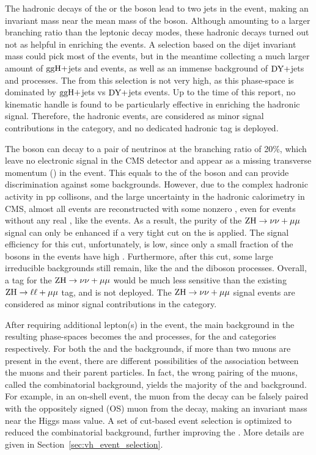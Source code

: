 The hadronic decays of the \PW or the \PZ boson lead to two jets in the event, making an invariant mass near the mean mass of the boson.
Although amounting to a larger branching ratio than the leptonic decay modes, these hadronic decays turned out not as helpful in enriching the \VH events.
A selection based on the dijet invariant mass could pick most of the \VH events, but in the meantime collecting a much larger amount of $\mathrm{g}\mathrm{g}\mathrm{H}+$jets and \qqH events, 
as well as an immense background of $\mbox{DY}+$jets and \ttbar processes.
The \SoB from this selection is not very high, as this phase-space is dominated by $\mathrm{g}\mathrm{g}\mathrm{H}+$jets vs $\mbox{DY}+$jets events.
Up to the time of this report, no kinematic handle is found to be particularly effective in enriching the hadronic \VH signal.
Therefore, the hadronic \VH events, are considered as minor signal contributions in the \ggH category, 
and no dedicated \VH hadronic tag is deployed.

The \PZ boson can decay to a pair of neutrinos at the branching ratio of 20\%, 
which leave no electronic signal in the CMS detector and appear as a missing transverse momentum (\MET) in the event.
This \MET equals to the \pt of the \PZ boson and can provide discrimination against some backgrounds.
However, due to the complex hadronic activity in pp collisons, and the large uncertainty in the hadronic calorimetry in CMS, 
almost all events are reconstructed with some nonzero \MET, even for events without any real \MET, like the \DY events.
As a result, the purity of the $\mathrm{Z}\mathrm{H} \to \nu\nu+\mu\mu$ signal can only be enhanced if a very tight cut on the \MET is applied.
The signal efficiency for this cut, unfortunately, is low, since only a small fraction of the \PZ bosons in the \ZH events have high \pt.
Furthermore, after this cut, some large irreducible backgrounds still remain, like the \ttbar and the diboson processes.
Overall, a tag for the $\mathrm{Z}\mathrm{H} \to \nu\nu+\mu\mu$ would be much less sensitive than the existing $\mathrm{Z}\mathrm{H} \to \ell\ell+\mu\mu$ tag, and is not deployed.
The $\mathrm{Z}\mathrm{H} \to \nu\nu+\mu\mu$ signal events are considered as minor signal contributions in the \ggH category.

After requiring additional lepton(s) in the event, the main background in the resulting \VH phase-spaces becomes the \WZ and \ZZ processes, for the \WH and \ZH categories respectively.
For both the \WZ and the \ZZ backgrounds, if more than two muons are present in the event, 
there are different possibilities of the association between the muons and their parent particles.
In fact, the wrong pairing of the muons, called the combinatorial background, yields the majority of the \WZ and \ZZ background.
For example, in an on-shell \WZ event, the muon from the \PW decay can be falsely paired with the oppositely signed (OS) muon from the \PZ decay, 
making an invariant mass near the Higgs mass value.
A set of cut-based event selection is optimized to reduced the combinatorial background, further improving the \SoB. 
More details are given in Section~\ref{sec:vh_event_selection}.

